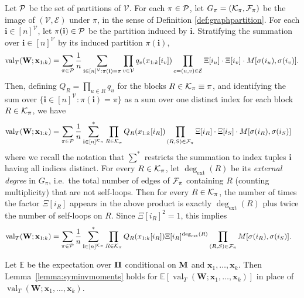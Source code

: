 \documentclass[10pt,reqno]{amsart}
\def\x{\mathbf{x}}
\def\W{\mathbf{W}}
\def\E{\mathbb{E}}
\def\cV{\mathcal{V}}
\def\cE{\mathcal{E}}
\def\val{\operatorname{val}}
\def\bi{\mathbf{i}}
\newcommand{\degext}{\deg_\mathrm{ext}}
\begin{document}
Let $\mathcal{P}$ be the set of partitions of $\cV$. For each $\pi \in \mathcal{P}$, let
$G_\pi=(\mathcal{K}_\pi,\mathcal{F}_\pi)$ be the image of $(\cV,\cE)$ under $\pi$, in the sense of
Definition \ref{def:graphpartition}. For each $\bi\in [n]^\cV$,
let $\pi(\bi) \in \cP$ be the partition induced by $\bi$.
Stratifying the summation over $\bi\in[n]^\cV$ by its
induced partition $\pi(\bi)$,
\[\val_T(\W;\x_{1:k})=\sum_{\pi \in \cP} \frac{1}{n}\sum_{\ib \in
[n]^{\cV}:\pi(\bi)=\pi}
	\prod_{v \in \cV} q_v(x_{1:k}[i_v]) \prod_{e=(u,v) \in \cE} 
	\Xi[i_u]\cdot\Xi[i_v]\cdot M[\sigma(i_u),\sigma(i_v)].\]
Then, defining $Q_R=\prod_{u \in R} q_u$ for the blocks $R \in \mathcal{K}_\pi \equiv \pi$,
and identifying the sum over $\{\bi\in[n]^\cV:\pi(\bi)=\pi\}$
as a sum over one distinct index for each block
$R \in \mathcal{K}_\pi$, we have
\begin{align*}
	\val_T(\W;\x_{1:k}) &= \sum_{\pi\in\cP}\frac{1}{n}
	\sum_{\bi\in[n]^{\cK_\pi}}^* \prod_{R \in \cK_\pi} Q_R(x_{1:k}[i_R])
	\prod_{(R,S)\in\cF_\pi} \Xi[i_R] \cdot \Xi[i_S] \cdot
	M[\sigma(i_R),\sigma(i_S)]
\end{align*}
where we recall the notation that $\overset{*}{\sum}$ restricts the summation 
to index tuples $\bi$ having all indices distinct.
For every $R\in\mathcal{K}_\pi$, let $\degext(R)$ be its \emph{external degree} in $G_\pi$,
i.e.\ the total number of edges of $\mathcal{F}_\pi$ containing $R$ (counting multiplicity)
that are not self-loops. Then for every $R\in\mathcal{K}_\pi$, the number of times the
factor $\Xi[i_R]$ appears in the above product is exactly $\degext(R)$ plus
twice the number of self-loops on $R$. Since $\Xi[i_R]^2=1$, this implies
\begin{align}\label{eq:orthovalasO}
	\val_T(\W;\x_{1:k}) &= \sum_{\pi\in\cP}\frac{1}{n}
	\sum_{\bi\in[n]^{\cK_\pi}}^* \prod_{R \in \cK_\pi} Q_R(x_{1:k}[i_R])
	\Xi[i_R]^{\degext(R)} \prod_{(R,S)\in\cF_\pi} M[\sigma(i_R),\sigma(i_S)].
\end{align}

\begin{lemma}\label{lemma:Esyminvmoments}
Let $\E$ be the expectation over $\bm{\Pi}$
conditional on $\mathbf{M}$ and $\x_1,\ldots,\x_k$.
Then Lemma~\ref{lemma:syminvmoments} holds for
$\E[\val_T(\W;\x_1,\ldots,\x_k)]$ in place of $\val_T(\W;\x_1,\ldots,\x_k)$.
\end{lemma}
\end{document}
